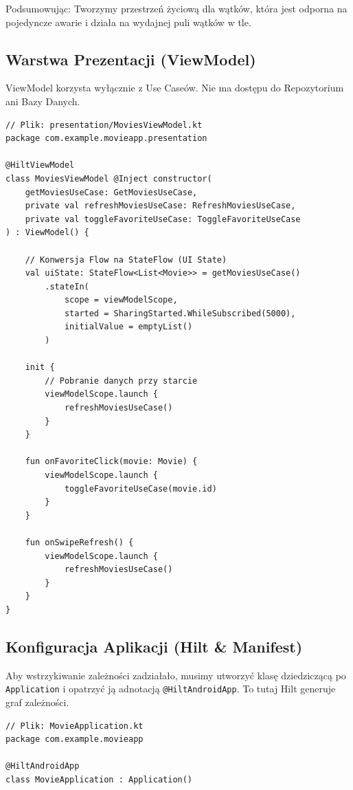 Podsumowując: Tworzymy przestrzeń życiową dla wątków, która jest odporna na pojedyncze awarie i działa na wydajnej puli wątków w tle.

\subsection{Warstwa Prezentacji (ViewModel)}

ViewModel korzysta wyłącznie z Use Caseów. Nie ma dostępu do Repozytorium ani Bazy Danych.

\begin{verbatim}
// Plik: presentation/MoviesViewModel.kt
package com.example.movieapp.presentation

@HiltViewModel
class MoviesViewModel @Inject constructor(
    getMoviesUseCase: GetMoviesUseCase,
    private val refreshMoviesUseCase: RefreshMoviesUseCase,
    private val toggleFavoriteUseCase: ToggleFavoriteUseCase
) : ViewModel() {

    // Konwersja Flow na StateFlow (UI State)
    val uiState: StateFlow<List<Movie>> = getMoviesUseCase()
        .stateIn(
            scope = viewModelScope,
            started = SharingStarted.WhileSubscribed(5000),
            initialValue = emptyList()
        )

    init {
        // Pobranie danych przy starcie
        viewModelScope.launch {
            refreshMoviesUseCase()
        }
    }

    fun onFavoriteClick(movie: Movie) {
        viewModelScope.launch {
            toggleFavoriteUseCase(movie.id)
        }
    }
    
    fun onSwipeRefresh() {
        viewModelScope.launch {
            refreshMoviesUseCase()
        }
    }
}
\end{verbatim}

\subsection{Konfiguracja Aplikacji (Hilt \& Manifest)}

Aby wstrzykiwanie zależności zadziałało, musimy utworzyć klasę dziedziczącą po \texttt{Application} i opatrzyć ją adnotacją \texttt{@HiltAndroidApp}. To tutaj Hilt generuje graf zależności.

\begin{verbatim}
// Plik: MovieApplication.kt
package com.example.movieapp

@HiltAndroidApp
class MovieApplication : Application()
\end{verbatim}

